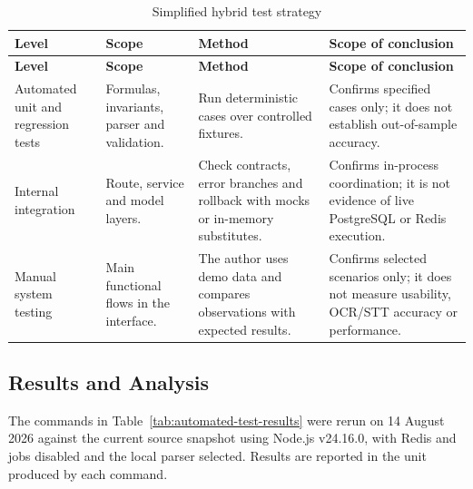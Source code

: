 \begin{longtable}{@{}L{2.4cm}L{3.5cm}L{4.3cm}L{4.0cm}@{}}
  \caption{Simplified hybrid test strategy}\label{tab:test-strategy}\\
  \toprule
  \textbf{Level} & \textbf{Scope} & \textbf{Method} & \textbf{Scope of conclusion} \\
  \midrule
  \endfirsthead
  \toprule
  \textbf{Level} & \textbf{Scope} & \textbf{Method} & \textbf{Scope of conclusion} \\
  \midrule
  \endhead
  Automated unit and regression tests & Formulas, invariants, parser and validation. & Run deterministic  cases over controlled fixtures. & Confirms specified cases only; it does not establish out-of-sample accuracy. \\
  Internal integration & Route, service and model layers. & Check contracts, error branches and rollback with mocks or in-memory substitutes. & Confirms in-process coordination; it is not evidence of live PostgreSQL or Redis execution. \\
  Manual system testing & Main functional flows in the interface. & The author uses demo data and compares observations with expected results. & Confirms selected scenarios only; it does not measure usability, OCR/STT accuracy or performance. \\
  \bottomrule
\end{longtable}

\subsection{Results and Analysis}
\label{subsec:results}

The commands in Table~\ref{tab:automated-test-results} were rerun on 14 August 2026 against the current source snapshot using Node.js v24.16.0, with Redis and jobs disabled and the local parser selected. Results are reported in the unit produced by each command.

